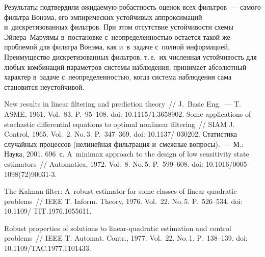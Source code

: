 \begin{multicols}{2}
Результаты под\-твер\-ди\-ли ожи\-да\-емую ро\-баст\-ность оценок всех фильт\-ров~--- 
самого фильт\-ра Вонэма, его эмпирических устойчивых аппроксимаций 
и~дискретизованных фильт\-ров. При этом отсутствие устой\-чи\-вости схемы  
Эй\-ле\-ра--Ма\-ру\-ямы в~по\-ста\-нов\-ке с~не\-опре\-де\-лен\-ностью остается такой же 
проб\-ле\-мой для фильт\-ра Вонэма, как и~в~задаче с~пол\-ной информацией. 
Преимущество дискретизованных фильт\-ров, т.\,е.\ их чис\-лен\-ная 
устойчивость для любых комбинаций па\-ра\-мет\-ров сис\-те\-мы наблюдения, 
принимает абсолютный характер в~задаче с~не\-опре\-де\-лен\-ностью, когда 
сис\-те\-ма наблюдения сама становится неустойчивой.

{\small\frenchspacing
 {\baselineskip=12pt
 \begin{thebibliography}{99}
       New results in linear filtering and prediction theory~// 
J.~Basic Eng.~--- T. ASME, 1961. Vol.~83. P.~95--108. doi: 10.1115/1.3658902.
       Some applications of stochastic differential equations to optimal 
nonlinear filtering~// SIAM J. Control, 1965. Vol.~2. No.\,3. P.~347--369. doi: 10.1137/ 030202.
 Статистика случайных процессов (нелинейная 
фильт\-ра\-ция и~смеж\-ные во\-про\-сы).~--- М.: Наука, 2001. 696~с.
 A~minimax approach to the design of low sensitivity 
state estimators~// Automatica, 1972. Vol.~8. No.\,5. P.~599--608. doi:  
10.1016/0005-1098(72)90031-3.

       The Kalman filter: A~robust estimator for some classes of linear quadratic 
problems~// IEEE T. Inform. Theory, 1976. Vol.~22. No.\,5. P.~526--534. doi: 
10.1109/ TIT.1976.1055611.

       Robust properties of solutions to linear-quadratic estimation and 
control problems~// IEEE T. Automat. Contr., 1977. Vol.~22. No.\,1. P.~138--139. doi: 
10.1109/TAC.1977.1101433.


\end{thebibliography}}}
\end{multicols}
